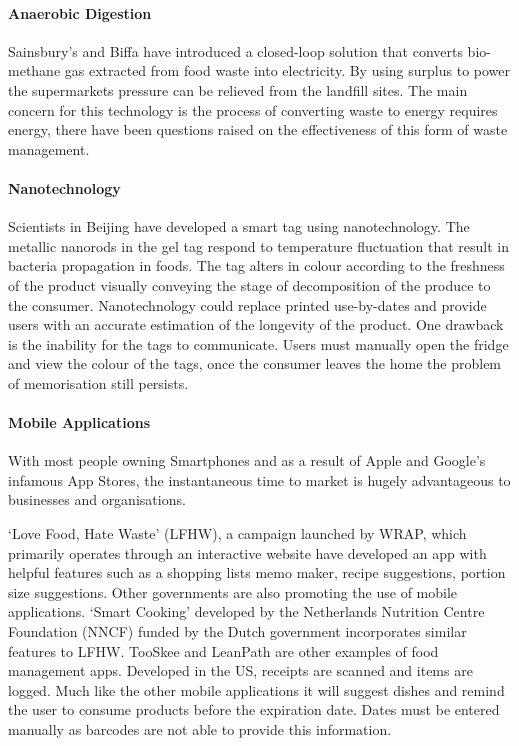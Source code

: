 \documentclass[a4paper, 11pt]{article}
\begin{document}
\paragraph{Anaerobic Digestion}
Sainsbury's and Biffa have introduced a closed-loop solution that converts bio-methane gas extracted from food waste into electricity. By using surplus to power the supermarkets pressure can be relieved from the landfill sites. The main concern for this technology is the process of converting waste to energy requires energy, there have been questions raised on the effectiveness of this form of waste management.\cite{anarobic} 

\paragraph{Nanotechnology}
Scientists in Beijing have developed a smart tag using nanotechnology. The metallic nanorods in the gel tag respond to temperature fluctuation that result in bacteria propagation in foods. The tag alters in colour according to the freshness of the product visually conveying the stage of decomposition of the produce to the consumer. Nanotechnology could replace printed use-by-dates and provide users with an accurate estimation of the longevity of the product. One drawback is the inability for the tags to communicate. Users must manually open the fridge and view the colour of the tags, once the consumer leaves the home the problem of memorisation still persists. \cite{FoodWaste}
\paragraph{Mobile Applications}
With most people owning Smartphones and as a result of Apple and Google's infamous App Stores, the instantaneous time to market is hugely advantageous to businesses and organisations. 

`Love Food, Hate Waste' (LFHW), a campaign launched by WRAP, which primarily operates through an interactive website have developed an app with helpful features such as a shopping lists memo maker, recipe suggestions, portion size suggestions. Other governments are also promoting the use of mobile applications. `Smart Cooking' developed by the Netherlands Nutrition Centre Foundation (NNCF) funded by the Dutch government incorporates similar features to LFHW. TooSkee and LeanPath\cite{foodWaste} are other examples of food management apps. Developed in the US, receipts are scanned and items are logged. Much like the other mobile applications it will suggest dishes and remind the user to consume products before the expiration date. Dates must be entered manually as barcodes are not able to provide this information. 
\end{document}
